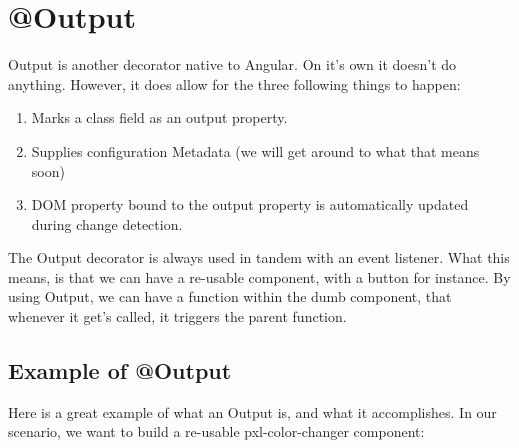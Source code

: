 \maketitle{}
\section{ @Output }

Output is another decorator native to Angular. On it's own it doesn't do
anything. However, it does allow for the three following things to happen:
\begin{enumerate}
  \item Marks a class field as an output property.
  \item Supplies configuration Metadata (we will get around to what that means
  soon)
  \item DOM property bound to the output property is automatically updated
  during change detection.
\end{enumerate}

The Output decorator is always used in tandem with an event listener. What this
means, is that we can have a re-usable component, with a button for instance.
By using Output, we can have a function within the dumb component, that whenever
it get's called, it triggers the parent function.

\subsection{ Example of @Output }

Here is a great example of what an Output is, and what it accomplishes. In
our scenario, we want to build a re-usable pxl-color-changer component:
\begin{lstlisting}

\end{lstlisting}
